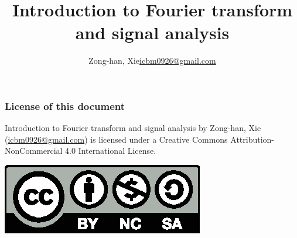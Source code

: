 \documentclass{beamer}
\title{Introduction to Fourier transform and signal analysis}
\author{\texorpdfstring{Zong-han, Xie\newline\url{icbm0926@gmail.com}}{Zong-han, Xie}}
\begin{document}
\begin{frame}
\titlepage
\end{frame}
\begin{frame}[label=licensepage]
\frametitle{License of this document}
Introduction to Fourier transform and signal analysis by Zong-han, Xie (\href{icbm0926@gmail.com}{icbm0926@gmail.com}) is licensed under a Creative Commons Attribution-NonCommercial 4.0 International License. \newline
\begin{center}
\includegraphics[scale=1]{by-nc-sa.eps}
\end{center}
\end{frame}
\end{document}
